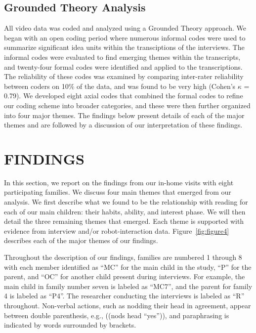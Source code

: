 \documentclass{sigchi}
\begin{document}
\subsection{Grounded Theory Analysis}
{\color{blue}All video data was coded and analyzed using a Grounded Theory \cite{Glaser:1967,Charmaz:2012} approach. We began with an open coding period where numerous informal codes were used to summarize significant idea units within the transciptions of the interviews. The informal codes were evaluated to find emerging themes within the transcripts, and twenty-four formal codes were identified and applied to the transcriptions.  The reliability of these codes was examined by comparing inter-rater reliability between coders on 10\% of the data, and was found to be very high (Cohen's $\kappa$ = 0.79). We developed eight axial codes that combined the formal codes to refine our coding scheme into broader categories, and these were then further organized into four major themes.} The findings below present details of each of the major themes and are followed by a discussion of our interpretation of these findings.
 
\section{FINDINGS}
In this section, we report on the findings from our in-home visits with eight participating families. We discuss four main themes that emerged from our analysis. We first describe what we found to be the relationship with reading for each of our main children: their habits, ability, and interest phase. We will then detail the three remaining themes that emerged. Each theme is supported with evidence from interview and/or robot-interaction data. Figure~\ref{fig:figure4} describes each of the major themes of our findings. 

Throughout the description of our findings, families are numbered 1 through 8 with each member identified as ``MC'' for the main child in the study, ``P'' for the parent, and ``OC'' for another child present during interviews. For example, the main child in family number seven is labeled as ``MC7'', and the parent for family 4 is labeled as ``P4''. The researcher conducting the interviews is labeled as ``R'' throughout. Non-verbal actions, such as nodding their head in agreement, appear between double parenthesis, e.g., ((nods head ``yes'')), and paraphrasing is indicated by words surrounded by brackets.
\end{document}
